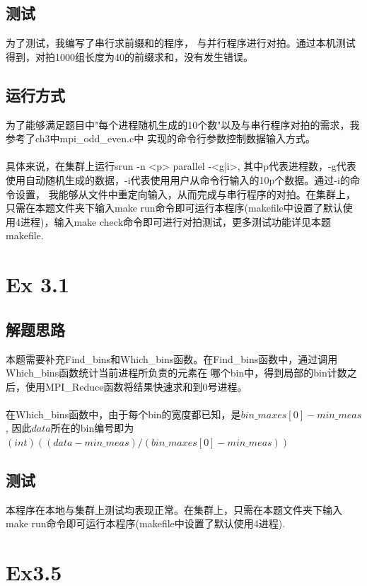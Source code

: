 \documentclass[UTF8]{article}
\begin{document}
\subsection{测试}
为了测试，我编写了串行求前缀和的程序，
与并行程序进行对拍。通过本机测试得到，对拍1000组长度为40的前缀求和，没有发生错误。

\subsection{运行方式}
为了能够满足题目中"每个进程随机生成的10个数"以及与串行程序对拍的需求，我参考了ch3中mpi\_odd\_even.c中
实现的命令行参数控制数据输入方式。\\\\

具体来说，在集群上运行srun -n <p> parallel -<g|i>, 其中p代表进程数，-g代表使用自动随机生成的数据，-i代表使用用户从命令行输入的10p个数据。通过-i的命令设置，
我能够从文件中重定向输入，从而完成与串行程序的对拍。在集群上，只需在本题文件夹下输入make run命令即可运行本程序(makefile中设置了默认使用4进程)，输入make check命令即可进行对拍测试，更多测试功能详见本题makefile.
\clearpage
\section{Ex 3.1}
\subsection{解题思路}
本题需要补充Find\_bins和Which\_bins函数。在Find\_bins函数中，通过调用Which\_bins函数统计当前进程所负责的元素在
哪个bin中，得到局部的bin计数之后，使用MPI\_Reduce函数将结果快速求和到0号进程。\\\\
在Which\_bins函数中，由于每个bin的宽度都已知，是$bin\_maxes[0] - min\_meas$, 因此$data$所在的bin编号即为$(int)((data - min\_meas) / (bin\_maxes[0] - min\_meas))$
\subsection{测试}
本程序在本地与集群上测试均表现正常。在集群上，只需在本题文件夹下输入make run命令即可运行本程序(makefile中设置了默认使用4进程).
\clearpage
\section{Ex3.5}
\end{document}
